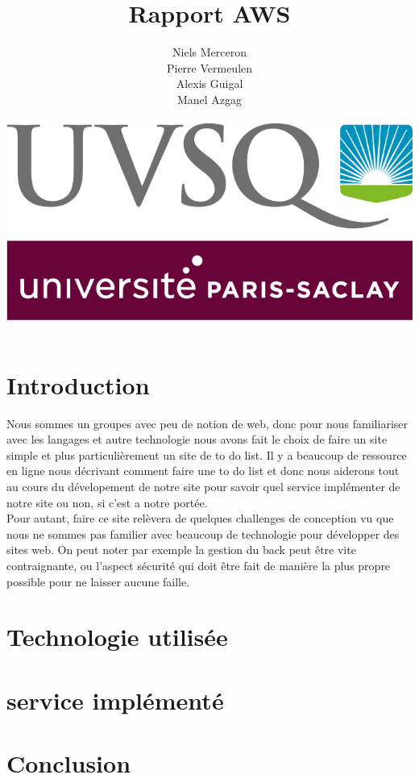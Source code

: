 \documentclass[a4paper,12pt]{report}
\date{}
\title{Rapport AWS }
\author{Niels Merceron \\ Pierre Vermeulen \\ Alexis Guigal \\ Manel Azgag \\ \\  \includegraphics[scale=0.20]{logo-UVSQ-2020-RVB.png}}
\begin{document}
	\maketitle
	
	\newpage
	 \tableofcontents
		\chapter{Introduction}
		
			Nous sommes un groupes avec peu de notion de web, donc pour nous familiariser avec les langages et autre technologie nous avons fait le choix de faire un site  simple et plus particulièrement un site de to do list. Il y a beaucoup de ressource en ligne nous décrivant comment faire une to do list et donc nous aiderons tout au cours du dévelopement de notre site pour savoir quel service implémenter de notre site ou non, si c'est a notre portée.
			\\Pour autant, faire ce site relèvera de quelques challenges de conception vu que nous ne sommes pas familier avec beaucoup de technologie pour développer des sites web.
			On peut noter par exemple la gestion du back peut être vite contraignante, ou l'aspect sécurité qui doit être fait de manière la plus propre possible pour ne laisser aucune faille.
			
  
		\chapter{Technologie utilisée}
			
			
		
		\chapter{service implémenté}
			

			
		\chapter{Conclusion}

			
\end{document}

